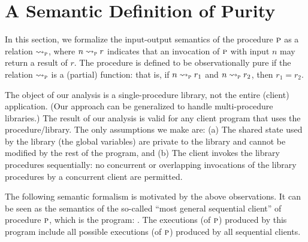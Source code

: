 \section{A Semantic Definition of Purity}
\label{sec:semantics}

In this section, we formalize the input-output semantics of the procedure $\textsc{p}$ as a relation $\rightsquigarrow_{\textsc{p}}$,
where $n \rightsquigarrow_{\textsc{p}} r$ indicates that an invocation of $\textsc{p}$ with input $n$ may return a result of $r$.
The procedure is defined to be observationally pure if the relation $\rightsquigarrow_{\textsc{p}}$ is a (partial) function:
that is, if  $n \rightsquigarrow_{\textsc{p}} r_1$ and $n \rightsquigarrow_{\textsc{p}} r_2$, then $r_1 = r_2$.

The object of our analysis is a single-procedure library,  not the entire (client) application.
(Our approach can be generalized to handle multi-procedure libraries.)
The result of our analysis is valid for any client program that uses the procedure/library.  The only
assumptions we make are: (a) The shared state used by the library (the
global variables) are private to the library and cannot be modified by the
rest of the program, and (b) The client invokes the library procedures
sequentially: no concurrent or overlapping invocations of the library
procedures by a concurrent client are permitted.

The following semantic formalism is motivated by the above observations. It can be seen as the semantics
of the so-called ``most general sequential client'' of procedure $\textsc{p}$, which is the program:
.
The executions (of $\textsc{p}$) produced by this program include all possible executions (of $\textsc{p}$)  produced by all
sequential clients.


